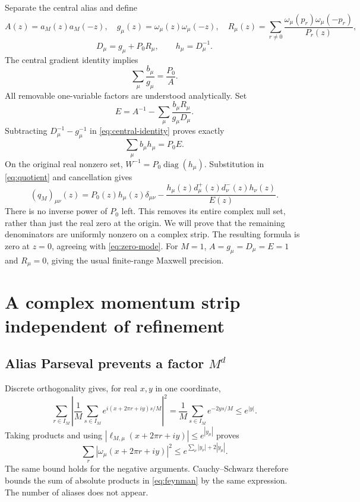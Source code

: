 \documentclass[11pt]{article}
\theoremstyle{remark}
\newcommand{\diag}{\operatorname{diag}}
\begin{document}
Separate the central alias and define
\[
 A(z)=a_M(z)a_M(-z),\quad
 g_\mu(z)=\omega_\mu(z)\omega_\mu(-z),\quad
 R_\mu(z)=\sum_{r\ne0}
       \frac{\omega_\mu(p_r)\omega_\mu(-p_r)}{P_r(z)},
\]
\[
 D_\mu=g_\mu+P_0R_\mu,\qquad h_\mu=D_\mu^{-1}.
\]
The central gradient identity implies
\begin{equation}\label{eq:central-identity}
 \sum_\mu\frac{b_\mu}{g_\mu}=\frac{P_0}{A}.
\end{equation}
All removable one-variable factors are understood analytically.
Set
\begin{equation}\label{eq:E}
 E=A^{-1}-\sum_\mu\frac{b_\mu R_\mu}{g_\mu D_\mu}.
\end{equation}
Subtracting $D_\mu^{-1}-g_\mu^{-1}$ in
\eqref{eq:central-identity} proves exactly
\[
 \sum_\mu b_\mu h_\mu=P_0E.
\]
On the original real nonzero set, $W^{-1}=P_0\diag(h_\mu)$.
Substitution in \eqref{eq:quotient} and cancellation gives
\begin{equation}\label{eq:canceled}
 (q_M)_{\mu\nu}(z)
 =P_0(z)h_\mu(z)\delta_{\mu\nu}
  -\frac{h_\mu(z)d_\mu^+(z)d_\nu^-(z)h_\nu(z)}{E(z)}.
\end{equation}
There is no inverse power of $P_0$ left. This removes its entire
complex null set, rather than just the real zero at the origin.
We will prove that the remaining denominators are uniformly nonzero
on a complex strip. The resulting formula is zero at $z=0$, agreeing
with \eqref{eq:zero-mode}. For $M=1$, $A=g_\mu=D_\mu=E=1$
and $R_\mu=0$, giving the usual finite-range Maxwell precision.

\section{A complex momentum strip independent of refinement}

\subsection{Alias Parseval prevents a factor $M^d$}

Discrete orthogonality gives, for real $x,y$ in one coordinate,
\[
 \sum_{r\in I_M}\left|
       \frac1M\sum_{s\in I_M}e^{i(x+2\pi r+iy)s/M}
                         \right|^2
 =\frac1M\sum_{s\in I_M}e^{-2ys/M}\le e^{|y|}.
\]
Taking products and using $|\ell_{M,\mu}(x+2\pi r+iy)|\le
e^{|y_\mu|}$ proves
\begin{equation}\label{eq:alias-parseval}
 \sum_r|\omega_\mu(x+2\pi r+iy)|^2
 \le e^{\sum_\nu|y_\nu|+2|y_\mu|}.
\end{equation}
The same bound holds for the negative arguments. Cauchy--Schwarz
therefore bounds the sum of absolute products in \eqref{eq:feynman}
by the same expression. The number of aliases does not appear.
\end{document}
